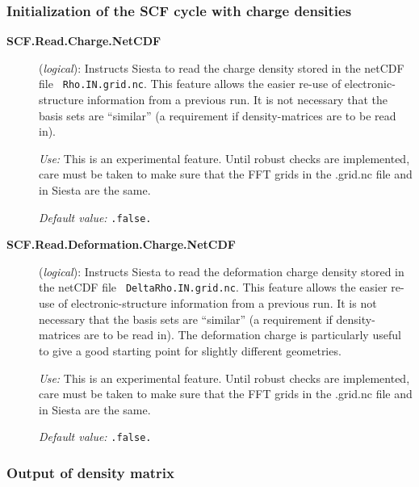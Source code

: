 \documentclass[11pt]{article}
\begin{document}
\subsubsection{Initialization of the SCF cycle with charge densities}

\begin{description}
\item[{\bf SCF.Read.Charge.NetCDF}] ({\it logical}):
   Instructs Siesta to read
  the charge density stored in the netCDF file {\tt
    Rho.IN.grid.nc}. This feature allows the easier re-use of
  electronic-structure information from a previous run. It is not
  necessary that the basis sets are ``similar'' (a requirement if
  density-matrices are to be read in).

{\it Use:} This is an experimental feature.  Until robust checks are
implemented, care must be taken to make sure that the FFT grids in the
.grid.nc file and in Siesta are the same.

{\it Default value:} {\tt .false.}

\item[{\bf SCF.Read.Deformation.Charge.NetCDF}] ({\it logical}):
    Instructs Siesta to read the
  deformation charge density stored in the netCDF file {\tt
    DeltaRho.IN.grid.nc}. This feature allows the easier re-use of
  electronic-structure information from a previous run. It is not
  necessary that the basis sets are ``similar'' (a requirement if
  density-matrices are to be read in). The deformation charge is
  particularly useful to give a good starting point for slightly
  different geometries.

{\it Use:} This is an experimental feature.  Until robust checks are
implemented, care must be taken to make sure that the FFT grids in the
.grid.nc file and in Siesta are the same.

{\it Default value:} {\tt .false.}

\end{description}



\subsubsection{Output of density matrix}
\end{document}
